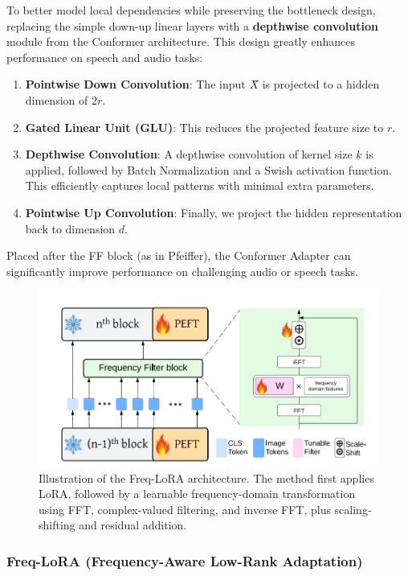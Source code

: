 \documentclass[11pt]{article}
\begin{document}
To better model local dependencies while preserving the bottleneck design, replacing the simple down-up linear layers with a \textbf{depthwise convolution} module from the Conformer architecture. This design greatly enhances performance on speech and audio tasks:

\begin{enumerate}
    \item \textbf{Pointwise Down Convolution}: The input $X̂$ is projected to a hidden dimension of $2r$. 
    \item \textbf{Gated Linear Unit (GLU)}: This reduces the projected feature size to $r$.
    \item \textbf{Depthwise Convolution}: A depthwise convolution of kernel size $k$ is applied, followed by Batch Normalization and a Swish activation function. This efficiently captures local patterns with minimal extra parameters.
    \item \textbf{Pointwise Up Convolution}: Finally, we project the hidden representation back to dimension $d$.
\end{enumerate}

Placed after the FF block (as in Pfeiffer), the Conformer Adapter can significantly improve performance on challenging audio or speech tasks.
\begin{figure}[ht]
    \centering
    \includegraphics[width=1.2\linewidth]{freq_image.png}
    \caption{Illustration of the Freq-LoRA architecture. The method first applies LoRA, followed by a learnable frequency-domain transformation using FFT, complex-valued filtering, and inverse FFT, plus scaling-shifting and residual addition.}
    \label{fig:freq-lora}
\end{figure}

\subsubsection{Freq-LoRA (Frequency-Aware Low-Rank Adaptation)}
\end{document}
